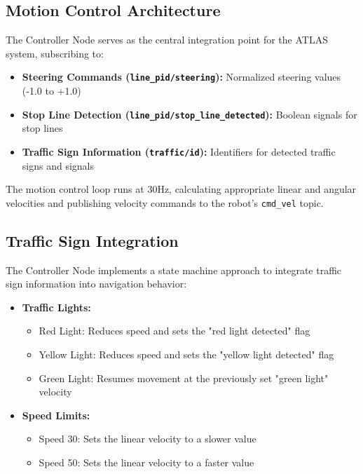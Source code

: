 \documentclass[9pt,technote]{IEEEtran}
\begin{document}
\subsection{Motion Control Architecture}
The Controller Node serves as the central integration point for the ATLAS system, subscribing to:

\begin{itemize}
    \item \textbf{Steering Commands (\texttt{line\_pid/steering}):} Normalized steering values (-1.0 to +1.0)
    \item \textbf{Stop Line Detection (\texttt{line\_pid/stop\_line\_detected}):} Boolean signals for stop lines
    \item \textbf{Traffic Sign Information (\texttt{traffic/id}):} Identifiers for detected traffic signs and signals
\end{itemize}

The motion control loop runs at 30Hz, calculating appropriate linear and angular velocities and publishing velocity commands to the robot's \texttt{cmd\_vel} topic.

\subsection{Traffic Sign Integration}
The Controller Node implements a state machine approach to integrate traffic sign information into navigation behavior:

\begin{itemize}
    \item \textbf{Traffic Lights:}
    \begin{itemize}
        \item Red Light: Reduces speed and sets the "red light detected" flag
        \item Yellow Light: Reduces speed and sets the "yellow light detected" flag
        \item Green Light: Resumes movement at the previously set "green light" velocity
    \end{itemize}
    
    \item \textbf{Speed Limits:}
    \begin{itemize}
        \item Speed 30: Sets the linear velocity to a slower value
        \item Speed 50: Sets the linear velocity to a faster value
    \end{itemize}
\end{itemize}
\end{document}
